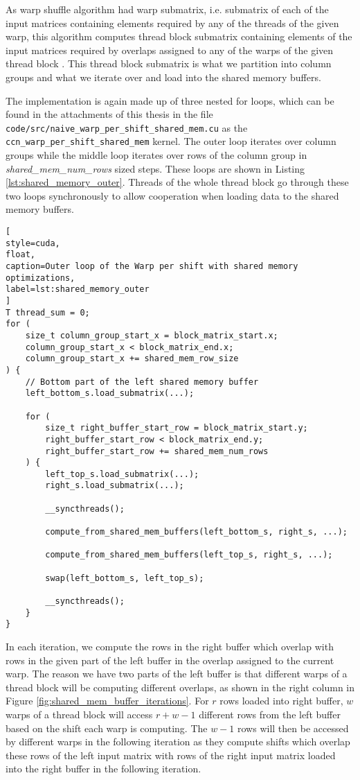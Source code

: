 As warp shuffle algorithm had warp submatrix, i.e. submatrix of each of the input matrices containing elements required by any of the threads of the given warp, this algorithm computes thread block submatrix containing elements of the input matrices required by overlaps assigned to any of the warps of the given thread block . This thread block submatrix is what we partition into column groups and what we iterate over and load into the shared memory buffers.

The implementation is again made up of three nested for loops, which can be found in the attachments of this thesis in the file \texttt{code/src/naive\_warp\_per\_shift\_shared\_mem.cu} as the \texttt{ccn\_warp\_per\_shift\_shared\_mem} kernel. The outer loop iterates over column groups while the middle loop iterates over rows of the column group in \textit{shared\_mem\_num\_rows} sized steps. These loops are shown in Listing \ref{lst:shared_memory_outer}. Threads of the whole thread block go through these two loops synchronously to allow cooperation when loading data to the shared memory buffers. 

\begin{lstlisting}[
style=cuda,
float,
caption=Outer loop of the Warp per shift with shared memory optimizations,
label=lst:shared_memory_outer
]
T thread_sum = 0;
for (
	size_t column_group_start_x = block_matrix_start.x;
	column_group_start_x < block_matrix_end.x;
	column_group_start_x += shared_mem_row_size
) {
	// Bottom part of the left shared memory buffer
	left_bottom_s.load_submatrix(...);
	
	for (
		size_t right_buffer_start_row = block_matrix_start.y;
		right_buffer_start_row < block_matrix_end.y;
		right_buffer_start_row += shared_mem_num_rows
	) {
		left_top_s.load_submatrix(...);
		right_s.load_submatrix(...);
		
		__syncthreads();
		
		compute_from_shared_mem_buffers(left_bottom_s, right_s, ...);
		
		compute_from_shared_mem_buffers(left_top_s, right_s, ...);
		
		swap(left_bottom_s, left_top_s);
		
		__syncthreads();
	}
}
\end{lstlisting}


In each iteration, we compute the rows in the right buffer which overlap with rows in the given part of the left buffer in the overlap assigned to the current warp. The reason we have two parts of the left buffer is that different warps of a thread block will be computing different overlaps, as shown in the right column in Figure \ref{fig:shared_mem_buffer_iterations}. For $r$ rows loaded into right buffer, $w$ warps of a thread block will access $r + w - 1$ different rows from the left buffer based on the shift each warp is computing. The $w - 1$ rows will then be accessed by different warps in the following iteration as they compute shifts which overlap these rows of the left input matrix with rows of the right input matrix loaded into the right buffer in the following iteration. 


